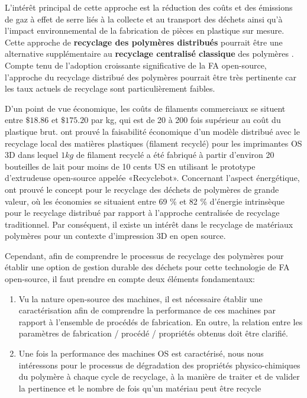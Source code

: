 L'intérêt principal de cette approche est la réduction des coûts et des émissions de gaz à effet de serre liés à la collecte et au transport des déchets ainsi qu'à l'impact environnemental de la fabrication de pièces en plastique sur mesure.
Cette approche de \textbf{recyclage des polymères distribués} pourrait être une alternative supplémentaire au \textbf{recyclage centralisé classique }des polymères \parencite{Baechler2013, Kreiger2014, Anzalone2013, Kreiger2013,Feeley2014}.
Compte tenu de l'adoption croissante significative de la FA open-source, l'approche du recyclage distribué des polymères pourrait être très pertinente car les taux actuels de recyclage sont particulièrement faibles.

D'un point de vue économique, les coûts de filaments commerciaux se situent entre $\$18.86$ et $\$175.20$ par kg,
qui est de 20 à 200 fois supérieur au coût du plastique brut.
\textcite{Wittbrodt2013, Kreiger2014}  ont prouvé la faisabilité économique d'un modèle distribué avec le recyclage local des matières plastiques (filament recyclé) pour les imprimantes OS 3D dans lequel $ 1 kg $ de filament recyclé a été fabriqué à partir d'environ 20 bouteilles de lait pour moins de 10 cents US en utilisant le prototype d'extrudeuse open-source  appelée «Recyclebot».
Concernant l'aspect énergétique,
\textcite{Kreiger2013,Baechler2013} ont prouvé le concept pour le recyclage des déchets de polymères de grande valeur, où les économies se situaient entre 69 \% et 82 \% d'énergie intrinsèque pour le recyclage distribué par rapport à l'approche centralisée de recyclage traditionnel.
Par conséquent, il existe un intérêt dans le recyclage de matériaux polymères pour un contexte d'impression 3D en open source. 

Cependant, afin de comprendre le processus de recyclage des polymères pour établir une option de gestion durable des déchets pour cette technologie de FA open-source, il faut prendre en compte deux éléments fondamentaux:

\begin{enumerate}
	\item Vu la nature open-source des machines, il est nécessaire établir une caractérisation afin de comprendre la performance de ces machines par rapport à l'ensemble de procédés de fabrication.
	En outre, la relation entre les paramètres de fabrication / procédé / propriétés obtenus doit être clarifié.

	\item Une fois la performance des machines OS est caractérisé, nous nous intéressons pour le processus de dégradation des propriétés physico-chimiques du polymère à chaque cycle de recyclage, à la manière de traiter et de valider la pertinence et le nombre de fois qu'un matériau peut être recycle  
\end{enumerate}

